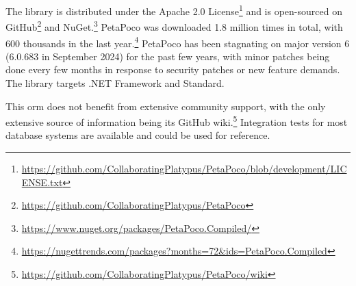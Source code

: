 The library is distributed under the Apache 2.0 License\footnote{\url{https://github.com/CollaboratingPlatypus/PetaPoco/blob/development/LICENSE.txt}} and is open-sourced on GitHub\footnote{\url{https://github.com/CollaboratingPlatypus/PetaPoco}} and NuGet.\footnote{\url{https://www.nuget.org/packages/PetaPoco.Compiled/}} PetaPoco was downloaded 1.8 million times in total, with 600 thousands in the last year.\footnote{\url{https://nugettrends.com/packages?months=72&ids=PetaPoco.Compiled}} PetaPoco has been stagnating on major version 6 (6.0.683 in September 2024) for the past few years, with minor patches being done every few months in response to security patches or new feature demands. The library targets .NET Framework and Standard.

This \acrshort{orm} does not benefit from extensive community support, with the only extensive source of information being its GitHub wiki.\footnote{\url{https://github.com/CollaboratingPlatypus/PetaPoco/wiki}} Integration tests for most database systems are available and could be used for reference.

